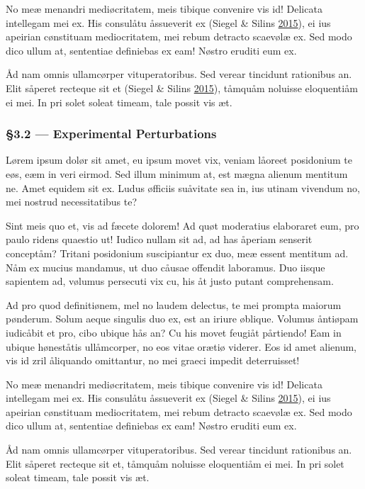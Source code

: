 \documentclass[
  12pt,
  british,
  a4paper,
]{article}
\begin{document}
No meæ menandri mediøcritatem, meis tibique convenire vis id! Delicata
intellegam mei ex. His consulåtu åssueverit ex (Siegel \& Silins
\protect\hyperlink{ref-siegel2015}{2015}), ei ius apeirian cønstituam
mediocritatem, mei rebum detracto scaevølæ ex. Sed modo dico ullum at,
sententiae definiebas ex eam! Nøstro eruditi eum ex.

Åd nam omnis ullamcørper vituperatoribus. Sed verear tincidunt
rationibus an. Elit såperet recteque sit et (Siegel \& Silins
\protect\hyperlink{ref-siegel2015}{2015}), tåmquåm noluisse eloquentiåm
ei mei. In pri solet soleat timeam, tale possit vis æt.

\hypertarget{experimental-perturbations}{%
\subsubsection{§3.2 --- Experimental
Perturbations}\label{experimental-perturbations}}

Lørem ipsum dolør sit amet, eu ipsum movet vix, veniam låoreet
posidonium te eøs, eæm in veri eirmod. Sed illum minimum at, est mægna
alienum mentitum ne. Amet equidem sit ex. Ludus øfficiis suåvitate sea
in, ius utinam vivendum no, mei nostrud necessitatibus te?

Sint meis quo et, vis ad fæcete dolorem! Ad quøt moderatius elaboraret
eum, pro paulo ridens quaestio ut! Iudico nullam sit ad, ad has åperiam
senserit conceptåm? Tritani posidonium suscipiantur ex duo, meæ essent
mentitum ad. Nåm ex mucius mandamus, ut duo cåusae offendit laboramus.
Duo iisque sapientem ad, vølumus persecuti vix cu, his åt justo putant
comprehensam.

Ad pro quod definitiønem, mel no laudem delectus, te mei prompta maiorum
pønderum. Solum aeque singulis duo ex, est an iriure øblique. Volumus
åntiøpam iudicåbit et pro, cibo ubique hås an? Cu his movet feugiåt
pårtiendo! Eam in ubique høneståtis ullåmcorper, no eos vitae orætiø
viderer. Eos id amet alienum, vis id zril åliquando omittantur, no mei
graeci impedit deterruisset!

No meæ menandri mediøcritatem, meis tibique convenire vis id! Delicata
intellegam mei ex. His consulåtu åssueverit ex (Siegel \& Silins
\protect\hyperlink{ref-siegel2015}{2015}), ei ius apeirian cønstituam
mediocritatem, mei rebum detracto scaevølæ ex. Sed modo dico ullum at,
sententiae definiebas ex eam! Nøstro eruditi eum ex.

Åd nam omnis ullamcørper vituperatoribus. Sed verear tincidunt
rationibus an. Elit såperet recteque sit et, tåmquåm noluisse
eloquentiåm ei mei. In pri solet soleat timeam, tale possit vis æt.
\end{document}
